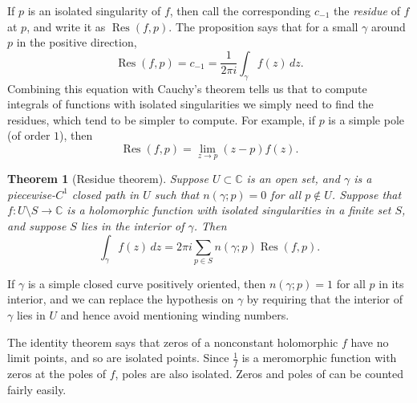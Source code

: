 \documentclass[12pt,openany]{book}
\newcommand{\C}{{\mathbb{C}}}
\newcommand{\myindex}[1]{#1\index{#1}}
\theoremstyle{plain}
\newtheorem{thm}{Theorem}[section]
\theoremstyle{remark}
\theoremstyle{definition}
\theoremstyle{exercise}
\theoremstyle{example}
\begin{document}
\pagebreak[3]
If $p$ is an isolated singularity of $f$, then call the corresponding
$c_{-1}$ the \emph{\myindex{residue}} of $f$ at $p$, and write it
as $\operatorname{Res}(f,p)$.
The proposition says that for a small $\gamma$ around $p$ in the positive direction,
\begin{equation*}
\operatorname{Res}(f,p) = c_{-1} = \frac{1}{2\pi i} \int_\gamma f(z) \, dz
.
\end{equation*}
Combining this equation with Cauchy's theorem tells us that to compute
integrals of functions with isolated singularities we simply need to find
the residues,
which tend to be simpler to
compute.  For example, if $p$ is a simple pole (of order $1$), then
\begin{equation*}
\operatorname{Res}(f,p) = \lim_{z \to p} (z-p)f(z) .
\end{equation*}

\begin{thm}[Residue theorem]\label{thm:residue}
Suppose $U \subset \C$ is an open set, and $\gamma$ is a piecewise-$C^1$
closed path in $U$
such that $n(\gamma;p)=0$ for all $p \not\in U$.
Suppose that $f \colon U \setminus S \to \C$ is a holomorphic function with isolated
singularities in a finite set $S$, and suppose $S$ lies in the interior of $\gamma$.
Then
\begin{equation*}
\int_{\gamma} f(z) \, dz = 2\pi i \sum_{p \in S} n(\gamma;p) \operatorname{Res}(f,p) .
\end{equation*}
\end{thm}

If $\gamma$ is a simple closed curve positively oriented,
then $n(\gamma;p)=1$ for all $p$ in
its interior, and we can replace the hypothesis on $\gamma$
by requiring that the interior of $\gamma$ lies in $U$ and hence avoid
mentioning winding numbers.

The identity theorem says that zeros of a nonconstant holomorphic $f$
have no limit points, and so are isolated points.
Since $\frac{1}{f}$ is a meromorphic
function with zeros at the poles of $f$, poles are also
isolated.  Zeros and poles of  can be counted fairly easily.
\end{document}
